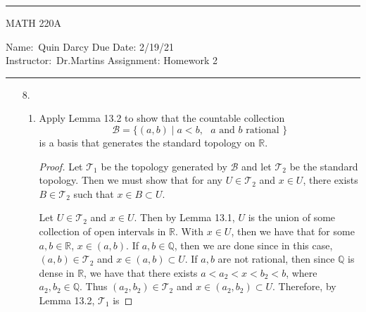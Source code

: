 \documentclass[12pt]{article}
\theoremstyle{definition}
\begin{document}
    \thispagestyle{empty}\hrule

    \begin{center}
        \vspace{.4cm} { \large MATH 220A}
    \end{center}
    {Name:\ Quin Darcy \hspace{\fill} Due Date: 2/19/21  \\
    { Instructor:}\ Dr.Martins \hspace{\fill} Assignment:
    Homework 2 \\ \hrule}

    \begin{enumerate}
        \item[8.]
            \begin{enumerate}
                \item Apply Lemma 13.2 to show that the countable collection
                    \begin{equation*}
                        \mathcal{B}=\{(a, b)\mid a<b, \text{ $a$ and $b$ rational }\} 
                    \end{equation*}
                is a basis that generates the standard topology on
                $\mathbb{R}$.
                    \begin{proof}
                        Let $\mathcal{T}_1$ be the topology generated by
                        $\mathcal{B}$ and let $\mathcal{T}_2$ be the standard
                        topology. Then we must show that for any
                        $U\in\mathcal{T}_2$ and $x\in U$, there exists
                        $B\in\mathcal{T}_2$ such that $x\in B\subset
                        U$. \par\hspace{4mm} Let $U\in\mathcal{T}_2$ and $x\in U$. Then by
                        Lemma 13.1, $U$ is the union of some collection of open intervals in
                        $\mathbb{R}$. With $x\in U$, then we have that for some
                        $a, b\in\mathbb{R}$, $x\in(a, b)$. If $a,
                        b\in\mathbb{Q}$, then we are done since in this case,
                        $(a, b)\in\mathcal{T}_2$ and $x\in(a, b)\subset U$. If
                        $a, b$ are not rational, then since $\mathbb{Q}$ is dense in
                        $\mathbb{R}$, we have that there exists
                        $a<a_2<x<b_2<b$, where $a_2, b_2\in\mathbb{Q}$. Thus
                        $(a_2, b_2)\in\mathcal{T}_2$ and $x\in(a_2, b_2)\subset
                        U$. Therefore, by Lemma 13.2, $\mathcal{T}_1$ is

\end{proof}
\end{enumerate}
\end{enumerate}
\end{document}

